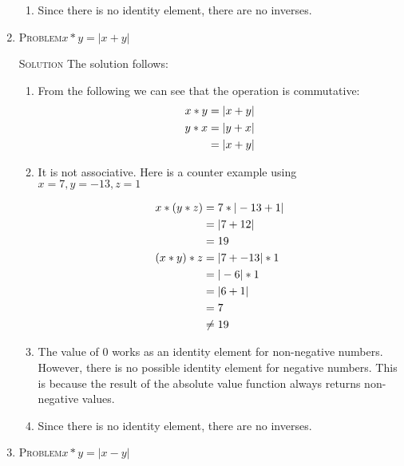 \documentclass{amsart}
\newcommand{\Solution}{\textsc{Solution}\xspace}
\newcommand{\Problem}{\textsc{Problem}\xspace}
\begin{document}
\begin{enumerate}
\begin{enumerate}
      \item Since there is no identity element, there are no inverses.

   \end{enumerate}

   \item \Problem $x * y = | x + y |$

   \noindent \Solution The solution follows:

   \begin{enumerate}
      \item From the following we can see that the operation is commutative:
      \begin{align*}
         x * y & = | x + y |         \\
	 y * x & = | y + x |         \\
	       & = | x + y | \notag  
      \end{align*}

      \item It is not associative. Here is a counter example using
      $x = 7, y = -13, z = 1$

      \begin{align*}
         x * (y * z) & = 7 * | -13 + 1 | \\
	             & = | 7 + 12 | \notag \\
		     & = 19         \notag \\
	 (x * y) * z & = | 7 + -13 | * 1   \\
	             & = | -6 | * 1 \notag \\
		     & = | 6 + 1 |  \notag \\
		     & = 7          \notag \\
		     & \ne 19       \notag
      \end{align*}

      \item The value of $0$ works as an identity element for non-negative
         numbers. However, there is no possible identity element for negative
         numbers. This is because the result of the absolute value
	 function always returns non-negative values.

      \item Since there is no identity element, there are no inverses.

   \end{enumerate}


   \item \Problem $x * y = | x - y |$


\end{enumerate}
\end{document}

